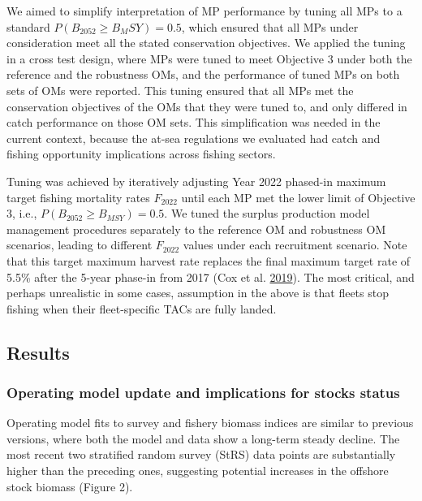 \documentclass[11pt]{book}
\begin{document}
We aimed to simplify interpretation of MP performance by tuning all MPs to a standard \(P(B_{2052} \geq B_MSY) = 0.5\), which ensured that all MPs under consideration meet all the stated conservation objectives. We applied the tuning in a cross test design, where MPs were tuned to meet Objective 3 under both the reference and the robustness OMs, and the performance of tuned MPs on both sets of OMs were reported. This tuning ensured that all MPs met the conservation objectives of the OMs that they were tuned to, and only differed in catch performance on those OM sets. This simplification was needed in the current context, because the at-sea regulations we evaluated had catch and fishing opportunity implications across fishing sectors.

Tuning was achieved by iteratively adjusting Year 2022 phased-in maximum target fishing mortality rates \(F_{2022}\) until each MP met the lower limit of Objective 3, i.e., \(P(B_{2052} \geq B_{MSY}) = 0.5\). We tuned the surplus production model management procedures separately to the reference OM and robustness OM scenarios, leading to different \(F_{2022}\) values under each recruitment scenario. Note that this target maximum harvest rate replaces the final maximum target rate of 5.5\% after the 5-year phase-in from 2017 (Cox et al. \protect\hyperlink{ref-cox2019evaluating}{2019}). The most critical, and perhaps unrealistic in some cases, assumption in the above is that fleets stop fishing when their fleet-specific TACs are fully landed.

\hypertarget{results}{%
\subsection{Results}\label{results}}

\hypertarget{operating-model-update-and-implications-for-stocks-status}{%
\subsubsection{Operating model update and implications for stocks status}\label{operating-model-update-and-implications-for-stocks-status}}

Operating model fits to survey and fishery biomass indices are similar to previous versions, where both the model and data show a long-term steady decline. The most recent two stratified random survey (StRS) data points are substantially higher than the preceding ones, suggesting potential increases in the offshore stock biomass (Figure 2).
\end{document}
